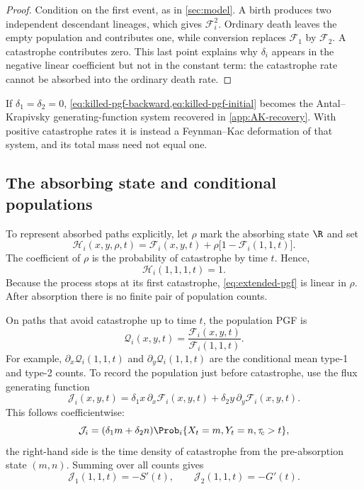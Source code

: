 \begin{proof}
Condition on the first event, as in \cref{sec:model}. A birth produces two independent descendant lineages, which gives $\mathcal F_i^2$. Ordinary death leaves the empty population and contributes one, while conversion replaces $\mathcal F_1$ by $\mathcal F_2$. A catastrophe contributes zero. This last point explains why $\delta_i$ appears in the negative linear coefficient but not in the constant term: the catastrophe rate cannot be absorbed into the ordinary death rate.
\end{proof}

If $\delta_1=\delta_2=0$, \cref{eq:killed-pgf-backward,eq:killed-pgf-initial} becomes the Antal--Krapivsky generating-function system recovered in \cref{app:AK-recovery}. With positive catastrophe rates it is instead a Feynman--Kac deformation of that system, and its total mass need not equal one.

\subsection{The absorbing state and conditional populations}

To represent absorbed paths explicitly, let $\rho$ mark the absorbing state $\R$ and set
\begin{equation}
\label{eq:extended-pgf}
\mathcal H_i(x,y,\rho,t)
=\mathcal F_i(x,y,t)
+\rho\bigl[1-\mathcal F_i(1,1,t)\bigr].
\end{equation}
The coefficient of $\rho$ is the probability of catastrophe by time $t$. Hence,
\begin{equation*}
\mathcal H_i(1,1,1,t)=1.
\end{equation*}
Because the process stops at its first catastrophe, \cref{eq:extended-pgf} is linear in $\rho$. After absorption there is no finite pair of population counts.

On paths that avoid catastrophe up to time $t$, the population PGF is
\begin{equation}
\label{eq:conditional-pgf}
\mathcal Q_i(x,y,t)
=\frac{\mathcal F_i(x,y,t)}
{\mathcal F_i(1,1,t)}.
\end{equation}
For example, $\partial_x\mathcal Q_i(1,1,t)$ and $\partial_y\mathcal Q_i(1,1,t)$ are the conditional mean type-1 and type-2 counts. To record the population just before catastrophe, use the flux generating function
\begin{equation*}
\mathcal J_i(x,y,t)
=\delta_1x\,\partial_x\mathcal F_i(x,y,t)
+\delta_2y\,\partial_y\mathcal F_i(x,y,t).
\end{equation*}
This follows coefficientwise:
\begin{equation*}
[x^my^n]\mathcal J_i
=(\delta_1m+\delta_2n)
\Prob_i\{X_t=m,Y_t=n,\tau_{\!c}>t\},
\end{equation*}
the right-hand side is the time density of catastrophe from the pre-absorption state $(m,n)$. Summing over all counts gives
\begin{equation*}
\mathcal J_1(1,1,t)=-S'(t),
\qquad
\mathcal J_2(1,1,t)=-G'(t).
\end{equation*}

